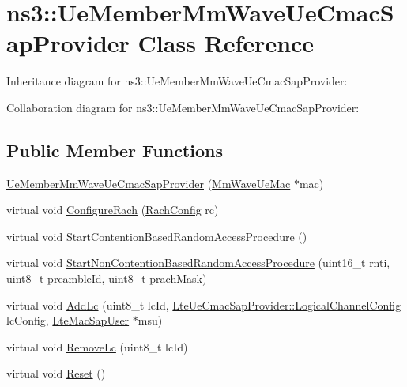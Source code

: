 \hypertarget{classns3_1_1UeMemberMmWaveUeCmacSapProvider}{}\section{ns3\+:\+:Ue\+Member\+Mm\+Wave\+Ue\+Cmac\+Sap\+Provider Class Reference}
\label{classns3_1_1UeMemberMmWaveUeCmacSapProvider}


Inheritance diagram for ns3\+:\+:Ue\+Member\+Mm\+Wave\+Ue\+Cmac\+Sap\+Provider\+:


Collaboration diagram for ns3\+:\+:Ue\+Member\+Mm\+Wave\+Ue\+Cmac\+Sap\+Provider\+:
\subsection*{Public Member Functions}
\begin{DoxyCompactItemize}
\item 
\hyperlink{classns3_1_1UeMemberMmWaveUeCmacSapProvider_a1b4ee344f5dff15acd8b53865b529250}{Ue\+Member\+Mm\+Wave\+Ue\+Cmac\+Sap\+Provider} (\hyperlink{classns3_1_1MmWaveUeMac}{Mm\+Wave\+Ue\+Mac} $\ast$mac)
\item 
virtual void \hyperlink{classns3_1_1UeMemberMmWaveUeCmacSapProvider_a2d9a59013db7c6049cb4997a9fd1f5ed}{Configure\+Rach} (\hyperlink{structns3_1_1LteUeCmacSapProvider_1_1RachConfig}{Rach\+Config} rc)
\item 
virtual void \hyperlink{classns3_1_1UeMemberMmWaveUeCmacSapProvider_a39c8c8fdbb3e16d680e903600bfcf5c3}{Start\+Contention\+Based\+Random\+Access\+Procedure} ()
\item 
virtual void \hyperlink{classns3_1_1UeMemberMmWaveUeCmacSapProvider_a893e465de20c21468168949bf3a57605}{Start\+Non\+Contention\+Based\+Random\+Access\+Procedure} (uint16\+\_\+t rnti, uint8\+\_\+t preamble\+Id, uint8\+\_\+t prach\+Mask)
\item 
virtual void \hyperlink{classns3_1_1UeMemberMmWaveUeCmacSapProvider_a42297b8d172d2c898b92768cea6a7370}{Add\+Lc} (uint8\+\_\+t lc\+Id, \hyperlink{structns3_1_1LteUeCmacSapProvider_1_1LogicalChannelConfig}{Lte\+Ue\+Cmac\+Sap\+Provider\+::\+Logical\+Channel\+Config} lc\+Config, \hyperlink{classns3_1_1LteMacSapUser}{Lte\+Mac\+Sap\+User} $\ast$msu)
\item 
virtual void \hyperlink{classns3_1_1UeMemberMmWaveUeCmacSapProvider_a9f06dc4b0ba954cda142a028d618f3dd}{Remove\+Lc} (uint8\+\_\+t lc\+Id)
\item 
virtual void \hyperlink{classns3_1_1UeMemberMmWaveUeCmacSapProvider_a3660887bd12154220e80a69bc93ac14e}{Reset} ()
\end{DoxyCompactItemize}
